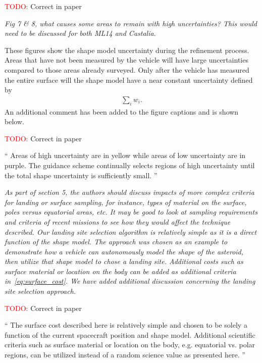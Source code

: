 \documentclass[11pt]{article}
\newcommand{\todo}{{\large \textcolor{red}{TODO: }}}
\newenvironment{correction}{\begin{list}{}{\setlength{\leftmargin}{1cm}\setlength{\rightmargin}{1cm}}\vspace{\parsep}\item[]``}{''\end{list}}
\newcommand{\comment}[1]{\item \itshape #1 \normalfont}
\begin{document}
\begin{itemize}
\todo Correct in paper

\comment{
Fig 7 \& 8, what causes some areas to remain with high uncertainties? This would need to be discussed for both ML14 and Castalia.
}

These figures show the shape model uncertainty during the refinement process.
Areas that have not been measured by the vehicle will have large uncertainties compared to those areas already surveyed. 
Only after the vehicle has measured the entire surface will the shape model have a near constant uncertainty defined by 
\begin{align*}
    \sum_i w_i.
\end{align*}
An additional comment has been added to the figure captions and is shown below.

\todo Correct in paper
\begin{correction}
    Areas of high uncertainty are in yellow while areas of low uncertainty are in purple.
    The guidance scheme continually selects regions of high uncertainty until the total shape uncertainty is sufficiently small.
\end{correction}

\comment{
As part of section 5, the authors should discuss impacts of more complex criteria for landing or surface sampling, for instance, types of material on the surface, poles versus equatorial areas, etc. 
It may be good to look at sampling requirements and criteria of recent missions to see how they would affect the technique described.
}
Our landing site selection algorithm is relatively simple as it is a direct function of the shape model.
The approach was chosen as an example to demonstrate how a vehicle can autonomously model the shape of the asteroid, then utilize that shape model to chose a landing site. 
Additional costs such as surface material or location on the body can be added as additional criteria in~\cref{eq:surface_cost}.
We have added additional discussion concerning the landing site selection approach.

\todo Correct in paper
\begin{correction}
    The surface cost described here is relatively simple and chosen to be solely a function of the current spacecraft position and shape model.
    Additional scientific criteria such as surface material or location on the body, e.g. equatorial vs. polar regions, can be utilized instead of a random science value as presented here.
\end{correction}


\end{itemize}
\end{document}
